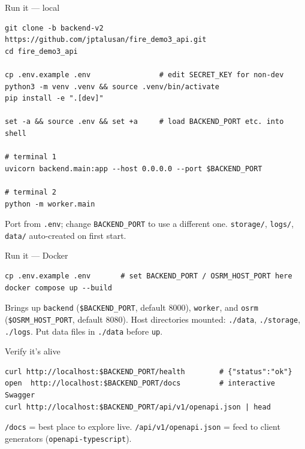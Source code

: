 \documentclass[aspectratio=169,11pt]{beamer}
\begin{document}
\begin{frame}[fragile]{Run it — local}
\begin{lstlisting}[language=shell,basicstyle=\ttfamily\scriptsize]
git clone -b backend-v2 https://github.com/jptalusan/fire_demo3_api.git
cd fire_demo3_api

cp .env.example .env                # edit SECRET_KEY for non-dev
python3 -m venv .venv && source .venv/bin/activate
pip install -e ".[dev]"

set -a && source .env && set +a     # load BACKEND_PORT etc. into shell

# terminal 1
uvicorn backend.main:app --host 0.0.0.0 --port $BACKEND_PORT

# terminal 2
python -m worker.main
\end{lstlisting}
\vspace{2pt}\small Port from \texttt{.env}; change \texttt{BACKEND\_PORT} to use a different one. \texttt{storage/}, \texttt{logs/}, \texttt{data/} auto-created on first start.
\end{frame}

\begin{frame}[fragile]{Run it — Docker}
\begin{lstlisting}[language=shell]
cp .env.example .env       # set BACKEND_PORT / OSRM_HOST_PORT here
docker compose up --build
\end{lstlisting}

\vspace{8pt}
\small Brings up \texttt{backend} (\texttt{\$BACKEND\_PORT}, default 8000),
\texttt{worker}, and \texttt{osrm} (\texttt{\$OSRM\_HOST\_PORT}, default 8080).
Host directories mounted: \texttt{./data}, \texttt{./storage}, \texttt{./logs}.
Put data files in \texttt{./data} before \texttt{up}.
\end{frame}

\begin{frame}[fragile]{Verify it's alive}
\begin{lstlisting}[language=shell]
curl http://localhost:$BACKEND_PORT/health        # {"status":"ok"}
open  http://localhost:$BACKEND_PORT/docs         # interactive Swagger
curl http://localhost:$BACKEND_PORT/api/v1/openapi.json | head
\end{lstlisting}
\vspace{8pt}\small \texttt{/docs} = best place to explore live. \texttt{/api/v1/openapi.json} = feed to client generators (\texttt{openapi-typescript}).
\end{frame}
\end{document}
